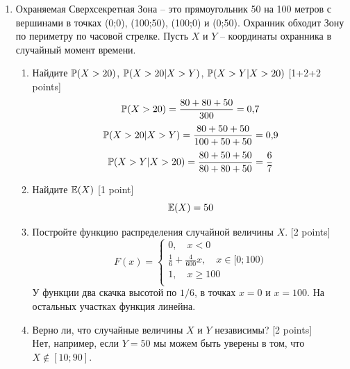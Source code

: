 \documentclass[12pt, a4paper]{article}\usepackage[]{graphicx}\usepackage[]{color}
\begin{document}
\begin{enumerate}
			\item Охраняемая Сверхсекретная Зона -- это прямоугольник 50 на 100 метров с вершинами в точках (0;0), (100;50), (100;0) и (0;50).  Охранник обходит Зону по периметру по часовой стрелке. Пусть $X$ и $Y$ -- координаты охранника в случайный момент времени.
			\begin{enumerate}
				\item Найдите $\P(X>20)$, $\P(X>20|X>Y)$, $\P(X>Y|X>20)$ [1+2+2 points]
				\begin{equation}
				\P(X>20)=\frac{80+80+50}{300}=0{,}7
				\end{equation}
				\begin{equation}
				\P(X>20|X>Y)=\frac{80+50+50}{100+50+50}=0{,}9
				\end{equation}
				\begin{equation}
				\P(X>Y|X>20)=\frac{80+50+50}{80+80+50}=\frac{6}{7}
				\end{equation}
				\item Найдите $\E(X)$ [1 point]%
				\begin{equation}
				\E(X)=50
				\end{equation}
				\item Постройте функцию распределения случайной величины $X$. [2 points]
				\begin{equation}
				F(x)=
				\begin{cases}
				0, \quad x<0 \\
				\frac{1}{6}+\frac{4}{600}x, \quad x\in [0;100) \\
				1, \quad x\geq 100 \\
				\end{cases}
				\end{equation}
				У функции два скачка высотой по $1/6$, в точках $x=0$ и $x=100$. На остальных участках функция линейна.
				\item Верно ли, что случайные величины $X$ и $Y$ независимы?  [2 points] \\
				Нет, например, если $Y=50$ мы можем быть уверены в том, что $X\notin [10;90]$.

			\end{enumerate}





\end{enumerate}
\end{document}
